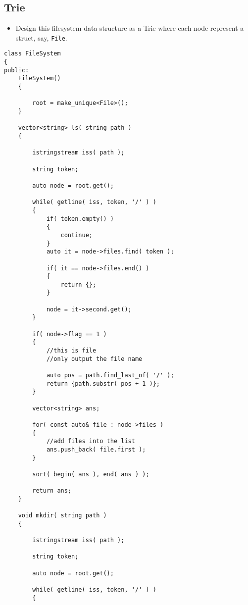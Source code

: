 \subsection{Trie}
\begin{itemize}
\item Design this filesystem data structure as a Trie where each node represent a struct, say, \texttt{File}.
\end{itemize}

\setcounter{lstlisting}{0}
\begin{lstlisting}[style=customc, caption={Trie}]
class FileSystem
{
public:
    FileSystem()
    {

        root = make_unique<File>();
    }

    vector<string> ls( string path )
    {

        istringstream iss( path );

        string token;

        auto node = root.get();

        while( getline( iss, token, '/' ) )
        {
            if( token.empty() )
            {
                continue;
            }
            auto it = node->files.find( token );

            if( it == node->files.end() )
            {
                return {};
            }

            node = it->second.get();
        }

        if( node->flag == 1 )
        {
            //this is file
            //only output the file name

            auto pos = path.find_last_of( '/' );
            return {path.substr( pos + 1 )};
        }

        vector<string> ans;

        for( const auto& file : node->files )
        {
            //add files into the list
            ans.push_back( file.first );
        }

        sort( begin( ans ), end( ans ) );

        return ans;
    }

    void mkdir( string path )
    {

        istringstream iss( path );

        string token;

        auto node = root.get();

        while( getline( iss, token, '/' ) )
        {


\end{lstlisting}
